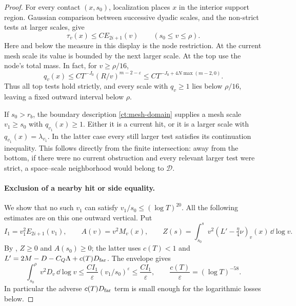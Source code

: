 \begin{proof}
For every contact $(x,s_0)$, localization places $x$ in the interior
support region.  Gaussian comparison between successive dyadic scales,
and the non-strict tests at larger scales, give
\begin{equation}\label{ct:contact-envelope}
 \tau_v(x)\le C E_{2i+1}(v)\qquad(s_0\le v\le\rho).
\end{equation}
Here and below the measure in this display is the node restriction.
At the current mesh scale its value is bounded by the next larger
scale.  At the top use the node's total mass.  In fact, for
$v\ge\rho/16$,
\[
 q_v(x)\le C T^{-J_0}(R/v)^{m-2-\varepsilon}
 \le C T^{-J_0+4N\max(m-2,0)}.
\]
Thus all top tests hold strictly, and every scale with $q_v\ge1$
lies below $\rho/16$, leaving a fixed outward interval below $\rho$.

If $s_0>r_b$, the boundary description
\eqref{ct:mesh-domain} supplies a mesh scale $v_1\ge s_0$ with
$q_{v_1}(x)\ge1$.  Either it is a current hit, or it is a larger scale
with $q_{v_1}(x)=\lambda_{v_1}$.  In the latter case every still larger
test satisfies its continuation inequality.  This follows directly
from the finite intersection: away from the bottom, if there were no
current obstruction and every relevant larger test were strict, a
space--scale neighborhood would belong to $\mathcal D$.

\paragraph{Exclusion of a nearby hit or side equality.}
We show that no such $v_1$ can satisfy
$v_1/s_0\le(\log T)^{20}$.  All the following estimates are on this
one outward vertical.  Put
\[
 I_1=v_1^2E_{2i+1}(v_1),\qquad A(v)=v^2M_v(x),\qquad
 Z(s)=\int_{s_0}^s v^2(L'-\tfrac\eta4\nu)_v(x)\,\dd\log v.
\]
By , $Z\ge0$ and $A(s_0)\ge0$; the latter
uses $c(T)<1$ and $L'=2M-D-C_Q\Lambda+c(T)D_{\rm far}$.
The envelope gives
\begin{equation}\label{ct:nearhit-cost}
 \int_{s_0}^{\rho}v^2D_v\,\dd\log v
 \le \frac{C I_1}{\varepsilon}
          (v_1/s_0)^\varepsilon
 \le \frac{C I_1}{\varepsilon},
 \qquad \frac{c(T)}\varepsilon=(\log T)^{-58}.
\end{equation}
In particular the adverse $c(T)D_{\rm far}$ term is small enough for
the logarithmic losses below.


\end{proof}
